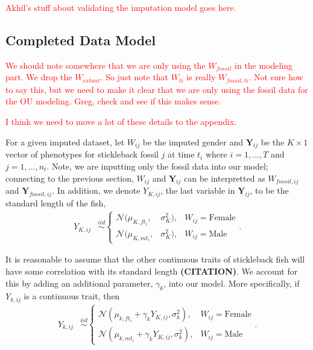 \documentclass[
  12pt,
]{article}
\begin{document}
\textcolor{red}{Akhil's stuff about validating the imputation model goes here.}

\hypertarget{completed-data-model}{%
\subsection{Completed Data Model}\label{completed-data-model}}

\textcolor{red}{We should note somewhere that we are only using the $W_{fossil}$ in the modeling part.  We drop the $W_{extant}$.  So just note that $W_{ti}$ is really $W_{fossil,ti}$.  Not sure how to say this, but we need to make it clear that we are only using the fossil data for the OU modeling.  Greg, check and see if this makes sense.}

\textcolor{red}{I think we need to move a lot of these details to the appendix.  }

For a given imputed dataset, let \(W_{ij}\) be the imputed gender and
\(\boldsymbol{Y}_{ij}\) be the \(K \times 1\) vector of phenotypes for
stickleback fossil \(j\) at time \(t_i\) where \(i = 1, \ldots, T\) and
\(j = 1,\ldots,n_{t}\). Note, we are inputting only the fossil data into
our model; connecting to the previous section, \(W_{ij}\) and
\(\boldsymbol{Y}_{ij}\) can be interpretted as \(W_{fossil,ij}\) and
\(\boldsymbol{Y}_{fossil,ij}\). In addition, we denote \(Y_{K,ij}\), the
last variable in \(\boldsymbol{Y}_{ij}\), to be the standard length of
the fish, \begin{align}
{Y}_{K,ij} & \overset{iid}{\sim}\left\{\begin{array}{lll} \mathcal{N}(\mu_{K,ft_i},&\sigma_{K}^2), & W_{ij} = \text{Female} \\ \mathcal{N}(\mu_{K,mt_i},&\sigma_{K}^2), & W_{ij} = \text{Male} \end{array}\right..
\label{eq:stl}
\end{align}

It is reasonable to assume that the other continuous traits of
stickleback fish will have some correlation with its standard length
\textbf{(CITATION)}. We account for this by adding an additional
parameter, \(\gamma_k\), into our model. More specifically, if
\(Y_{k,ij}\) is a continuous trait, then \begin{align}
{Y}_{k,ij} & \overset{iid}{\sim}\left\{\begin{array}{llll} \mathcal{N}(\mu_{k,ft_i} + \gamma_kY_{K,ij},\sigma_k^2), & W_{ij} = \text{Female} \\ \mathcal{N}(\mu_{k,mt_i} + \gamma_kY_{K,ij},\sigma_k^2), & W_{ij} = \text{Male} \end{array}\right..
\label{eq:cont}
\end{align}
\end{document}
